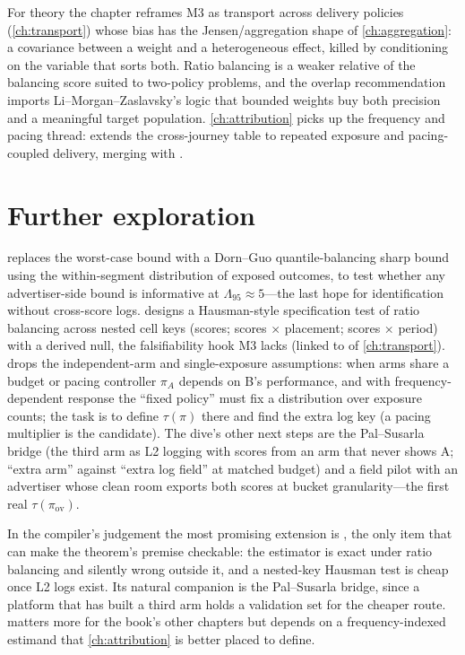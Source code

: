 For theory the chapter reframes M3 as transport across delivery policies (\cref{ch:transport}) whose bias has the Jensen/aggregation shape of \cref{ch:aggregation}: a covariance between a weight and a heterogeneous effect, killed by conditioning on the variable that sorts both. Ratio balancing is a weaker relative of the balancing score suited to two-policy problems, and the overlap recommendation imports Li--Morgan--Zaslavsky's logic that bounded weights buy both precision and a meaningful target population. \cref{ch:attribution} picks up the frequency and pacing thread:  extends the cross-journey table to repeated exposure and pacing-coupled delivery, merging with .

\section{Further exploration}

 replaces the worst-case bound with a Dorn--Guo quantile-balancing sharp bound using the within-segment distribution of exposed outcomes, to test whether any advertiser-side bound is informative at $\Lambda_{95} \approx 5$---the last hope for identification without cross-score logs.  designs a Hausman-style specification test of ratio balancing across nested cell keys (scores; scores $\times$ placement; scores $\times$ period) with a derived null, the falsifiability hook M3 lacks (linked to  of \cref{ch:transport}).  drops the independent-arm and single-exposure assumptions: when arms share a budget or pacing controller $\pi_A$ depends on B's performance, and with frequency-dependent response the ``fixed policy'' must fix a distribution over exposure counts; the task is to define $\tau(\pi)$ there and find the extra log key (a pacing multiplier is the candidate). The dive's other next steps are the Pal--Susarla bridge (the third arm as L2 logging with scores from an arm that never shows A; ``extra arm'' against ``extra log field'' at matched budget) and a field pilot with an advertiser whose clean room exports both scores at bucket granularity---the first real $\tau(\pi_{\mathrm{ov}})$.

In the compiler's judgement the most promising extension is , the only item that can make the theorem's premise checkable: the estimator is exact under ratio balancing and silently wrong outside it, and a nested-key Hausman test is cheap once L2 logs exist. Its natural companion is the Pal--Susarla bridge, since a platform that has built a third arm holds a validation set for the cheaper route.  matters more for the book's other chapters but depends on a frequency-indexed estimand that \cref{ch:attribution} is better placed to define.

